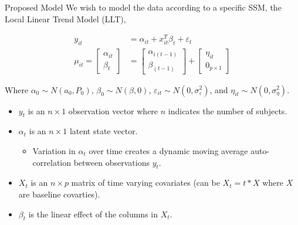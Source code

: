 \documentclass[
  ignorenonframetext,
]{beamer}
\providecommand{\tightlist}{%
  \setlength{\itemsep}{0pt}\setlength{\parskip}{0pt}}
\begin{document}
\begin{frame}{Proposed Model}
\protect\hypertarget{proposed-model}{}
We wish to model the data according to a specific SSM, the Local Linear
Trend Model (LLT),

\begin{align*}
y_{it} &= \alpha_{it} + x_{it}^T\beta_t
+ \varepsilon_t\\
\mu_{it} =
\begin{bmatrix}
\alpha_{it}\\
\beta_{t}
\end{bmatrix} &= 
\begin{bmatrix}
\alpha_{i(t-1)}\\
\beta_{(t-1)}
\end{bmatrix} + 
\begin{bmatrix}
\eta_{it} \\
0_{p \times 1}
\end{bmatrix}
\end{align*}

Where \(\alpha_0 \sim N(a_0, P_0)\), \(\beta_0 \sim N(\beta, 0)\),
\(\varepsilon_{it} \sim N(0, \sigma^2_\varepsilon)\), and
\(\eta_{it} \sim N(0, \sigma^2_\eta)\).

\begin{itemize}
\tightlist
\item
  \(y_t\) is an \(n \times 1\) observation vector where \(n\) indicates
  the number of subjects.
\item
  \(\alpha_t\) is an \(n \times 1\) latent state vector.

  \begin{itemize}
  \tightlist
  \item
    Variation in \(\alpha_t\) over time creates a dynamic moving average
    auto-correlation between observations \(y_t\).
  \end{itemize}
\item
  \(X_t\) is an \(n \times p\) matrix of time varying covariates (can be
  \(X_t = t * X\) where \(X\) are baseline covarties).
\item
  \(\beta_t\) is the linear effect of the columns in \(X_t\).
\end{itemize}
\end{frame}
\end{document}
